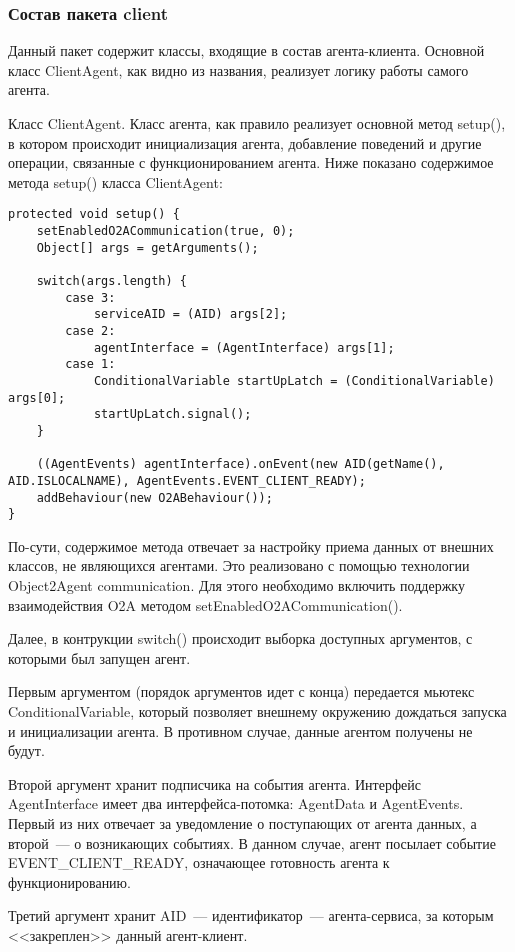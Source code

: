 \subsubsection{Состав пакета client}
Данный пакет содержит классы, входящие в состав агента-клиента. Основной класс ClientAgent, как видно из названия, реализует логику работы самого агента.

Класс ClientAgent. Класс агента, как правило реализует основной метод setup(), в котором происходит инициализация агента, добавление поведений и другие операции, связанные с функционированием агента.
Ниже показано содержимое метода setup() класса ClientAgent:
\begin{lstlisting}
protected void setup() {
    setEnabledO2ACommunication(true, 0);
    Object[] args = getArguments();

    switch(args.length) {
        case 3:
            serviceAID = (AID) args[2];
        case 2:
            agentInterface = (AgentInterface) args[1];
        case 1:
            ConditionalVariable startUpLatch = (ConditionalVariable) args[0];
            startUpLatch.signal();
    }

    ((AgentEvents) agentInterface).onEvent(new AID(getName(), AID.ISLOCALNAME), AgentEvents.EVENT_CLIENT_READY);
    addBehaviour(new O2ABehaviour());
}
\end{lstlisting}

По-сути, содержимое метода отвечает за настройку приема данных от внешних классов, не являющихся агентами. Это реализовано с помощью технологии Object2Agent communication. Для этого необходимо включить поддержку взаимодействия O2A методом setEnabledO2ACommunication().

Далее, в контрукции switch() происходит выборка доступных аргументов, с которыми был запущен агент.

Первым аргументом (порядок аргументов идет с конца) передается мьютекс ConditionalVariable, который позволяет внешнему окружению дождаться запуска и инициализации агента. В противном случае, данные агентом получены не будут.

Второй аргумент хранит подписчика на события агента. Интерфейс AgentInterface имеет два интерфейса-потомка: AgentData и AgentEvents. Первый из них отвечает за уведомление о поступающих от агента данных, а второй~--- о возникающих событиях. В данном случае, агент посылает событие EVENT\_CLIENT\_READY, означающее готовность агента к функционированию.

Третий аргумент хранит AID~--- идентификатор~--- агента-сервиса, за которым <<закреплен>> данный агент-клиент.

